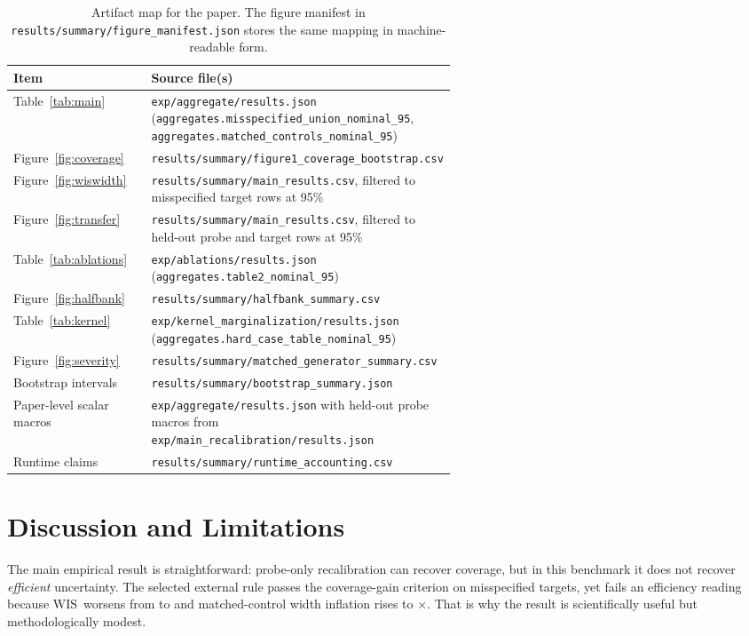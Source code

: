 \documentclass{article}
\newcommand{\wis}{\ensuremath{\mathrm{WIS}}}
\begin{document}
\begin{table}[t]
\caption{Artifact map for the paper. The figure manifest in \texttt{results/summary/figure\_manifest.json} stores the same mapping in machine-readable form.}
\label{tab:artifacts}
\centering
\small
\begin{tabular}{lp{0.58\linewidth}}
\toprule
Item & Source file(s) \\
\midrule
Table~\ref{tab:main} & \texttt{exp/aggregate/results.json} (\texttt{aggregates.misspecified\_union\_nominal\_95}, \texttt{aggregates.matched\_controls\_nominal\_95}) \\
Figure~\ref{fig:coverage} & \texttt{results/summary/figure1\_coverage\_bootstrap.csv} \\
Figure~\ref{fig:wiswidth} & \texttt{results/summary/main\_results.csv}, filtered to misspecified target rows at 95\% \\
Figure~\ref{fig:transfer} & \texttt{results/summary/main\_results.csv}, filtered to held-out probe and target rows at 95\% \\
Table~\ref{tab:ablations} & \texttt{exp/ablations/results.json} (\texttt{aggregates.table2\_nominal\_95}) \\
Figure~\ref{fig:halfbank} & \texttt{results/summary/halfbank\_summary.csv} \\
Table~\ref{tab:kernel} & \texttt{exp/kernel\_marginalization/results.json} (\texttt{aggregates.hard\_case\_table\_nominal\_95}) \\
Figure~\ref{fig:severity} & \texttt{results/summary/matched\_generator\_summary.csv} \\
Bootstrap intervals & \texttt{results/summary/bootstrap\_summary.json} \\
Paper-level scalar macros & \texttt{exp/aggregate/results.json} with held-out probe macros from \texttt{exp/main\_recalibration/results.json} \\
Runtime claims & \texttt{results/summary/runtime\_accounting.csv} \\
\bottomrule
\end{tabular}
\end{table}

\section{Discussion and Limitations}
\label{sec:discussion}
The main empirical result is straightforward: probe-only recalibration can recover coverage, but in this benchmark it does not recover \emph{efficient} uncertainty. The selected external rule passes the coverage-gain criterion on misspecified targets, yet fails an efficiency reading because \wis\ worsens from \MissUncalWIS{} to \MissSelectedWIS{} and matched-control width inflation rises to \MatchedSelectedWidthInfl{}$\times$. That is why the result is scientifically useful but methodologically modest.
\end{document}
